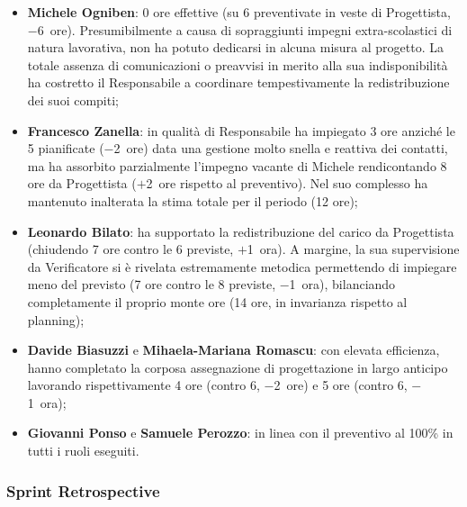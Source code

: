 \documentclass[a4paper, 11pt, oneside]{scrartcl} %
\begin{document}
\begin{itemize}[noitemsep, topsep=2pt]
  \item \textbf{Michele Ogniben}: 0 ore effettive (su 6 preventivate in veste di Progettista, $-$6~ore). Presumibilmente a causa di sopraggiunti impegni extra-scolastici di natura lavorativa, non ha potuto dedicarsi in alcuna misura al progetto. La totale assenza di comunicazioni o preavvisi in merito alla sua indisponibilità ha costretto il Responsabile a coordinare tempestivamente la redistribuzione dei suoi compiti;
  \item \textbf{Francesco Zanella}: in qualità di Responsabile ha impiegato 3 ore anziché le 5 pianificate ($-$2~ore) data una gestione molto snella e reattiva dei contatti, ma ha assorbito parzialmente l'impegno vacante di Michele rendicontando 8 ore da Progettista ($+$2~ore rispetto al preventivo). Nel suo complesso ha mantenuto inalterata la stima totale per il periodo (12 ore);
  \item \textbf{Leonardo Bilato}: ha supportato la redistribuzione del carico da Progettista (chiudendo 7 ore contro le 6 previste, $+$1~ora). A margine, la sua supervisione da Verificatore si è rivelata estremamente metodica permettendo di impiegare meno del previsto (7 ore contro le 8 previste, $-$1~ora), bilanciando completamente il proprio monte ore (14 ore, in invarianza rispetto al planning);
  \item \textbf{Davide Biasuzzi} e \textbf{Mihaela-Mariana Romascu}: con elevata efficienza, hanno completato la corposa assegnazione di progettazione in largo anticipo lavorando rispettivamente 4 ore (contro 6, $-$2~ore) e 5 ore (contro 6, $-$1~ora);
  \item \textbf{Giovanni Ponso} e \textbf{Samuele Perozzo}: in linea con il preventivo al 100\% in tutti i ruoli eseguiti.
\end{itemize}

\subsubsection*{Sprint Retrospective}
\end{document}
